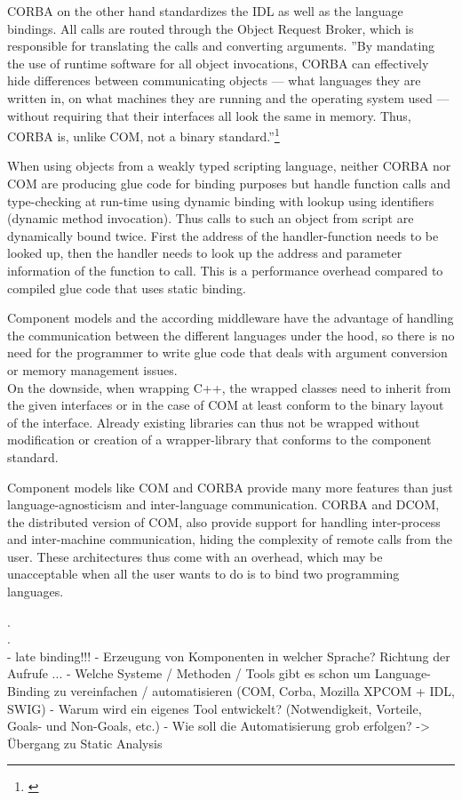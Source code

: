 CORBA on the other hand standardizes the IDL as well as the language bindings. All calls are routed through the Object Request Broker, which is responsible for translating the calls and converting arguments. ''By mandating the use of runtime software for all object invocations, CORBA can effectively hide differences between communicating objects — what languages they are written in, on what machines they are running and the operating system used — without requiring that their interfaces all look the same in memory. Thus, CORBA is, unlike COM, not a binary standard.''\footnote{\citep[83]{ComponentTechnology}}

When using objects from a weakly typed scripting language, neither CORBA nor COM are producing glue code for binding purposes but handle function calls and type-checking at run-time using dynamic binding with lookup using identifiers (dynamic method invocation). Thus calls to such an object from script are dynamically bound twice. First the address of the handler-function needs to be looked up, then the handler needs to look up the address and parameter information of the function to call. This is a performance overhead compared to compiled glue code that uses static binding.

Component models and the according middleware have the advantage of handling the communication between the different languages under the hood, so there is no need for the programmer to write glue code that deals with argument conversion or memory management issues.\\
On the downside, when wrapping C++, the wrapped classes need to inherit from the given interfaces or in the case of COM at least conform to the binary layout of the interface. Already existing libraries can thus not be wrapped without modification or creation of a wrapper-library that conforms to the component standard.

Component models like COM and CORBA provide many more features than just language-agnosticism and inter-language communication. CORBA and DCOM, the distributed version of COM, also provide support for handling inter-process and inter-machine communication, hiding the complexity of remote calls from the user. These architectures thus come with an overhead, which may be unacceptable when all the user wants to do is to bind two programming languages.


.\\
.\\
  - late binding!!!
  - Erzeugung von Komponenten in welcher Sprache? Richtung der Aufrufe ...
  - Welche Systeme / Methoden / Tools gibt es schon um Language-Binding zu vereinfachen / automatisieren (COM, Corba, Mozilla XPCOM + IDL, SWIG)
  - Warum wird ein eigenes Tool entwickelt? (Notwendigkeit, Vorteile, Goals- und Non-Goals, etc.)
  - Wie soll die Automatisierung grob erfolgen? -> Übergang zu Static Analysis